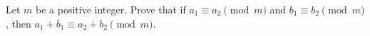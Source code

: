 Let $m$ be a positive integer. Prove that if $a_1\equiv a_2\pmod m$ and $b_1\equiv b_2\pmod m$, then $a_1+b_1\equiv a_2+b_2\pmod m$.
